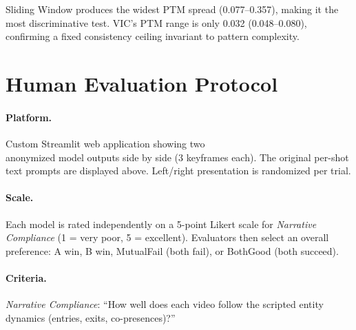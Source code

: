 \documentclass[sigconf,review,anonymous]{acmart}
\begin{document}
Sliding Window produces the widest PTM spread (0.077--0.357), making it the most discriminative test.
VIC's PTM range is only 0.032 (0.048--0.080), confirming a fixed consistency ceiling invariant to pattern complexity.


\section{Human Evaluation Protocol}
\label{app:human_eval}

\paragraph{Platform.}
Custom Streamlit web application showing 
two \\ anonymized model outputs side by side (3 keyframes each). The original per-shot text prompts are displayed above. Left/right presentation is randomized per trial.

\paragraph{Scale.}
Each model is rated independently on a 5-point Likert scale for \emph{Narrative Compliance} (1 = very poor, 5 = excellent). Evaluators then select an overall preference: A win, B win, MutualFail (both fail), or BothGood (both succeed).

\paragraph{Criteria.}
\emph{Narrative Compliance}: ``How well does each video follow the scripted entity dynamics (entries, exits, co-presences)?''
\end{document}
